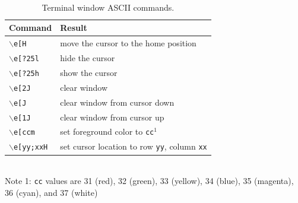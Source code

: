 \documentclass[epsfig,10pt,fullpage]{article}
\newcommand{\CommonDocsPath}{../../common/docs}
\begin{document}
\begin{table}[h]
\caption{Terminal window ASCII commands.}
~\\
\centering
\label{vt100}
\begin{tabular}{l|l}
		  {\bf Command} & {\bf Result} \\ \hline
		  \texttt{$\backslash$e[H} & move the cursor to the home position\\
		  \texttt{$\backslash$e[?25l} & hide the cursor \\
		  \texttt{$\backslash$e[?25h} & show the cursor \\
		  \texttt{$\backslash$e[2J} & clear window \\
		  \texttt{$\backslash$e[J} & clear window from cursor down \\ 
		  \texttt{$\backslash$e[1J} & clear window from cursor up \\
		  \texttt{$\backslash$e[ccm} & set foreground color to \texttt{cc}$^1$ \\
		  \texttt{$\backslash$e[yy;xxH} & set cursor location to row \texttt{yy}, column \texttt{xx}
		  
\end{tabular}
\end{table}

~\\
\noindent
Note 1: \texttt{cc} values are 31 (red), 32 (green), 33 (yellow), 34 (blue), 35 (magenta), 36
(cyan), and 37 (white)

~\\
\noindent

\noindent
\newpage

\end{document}
